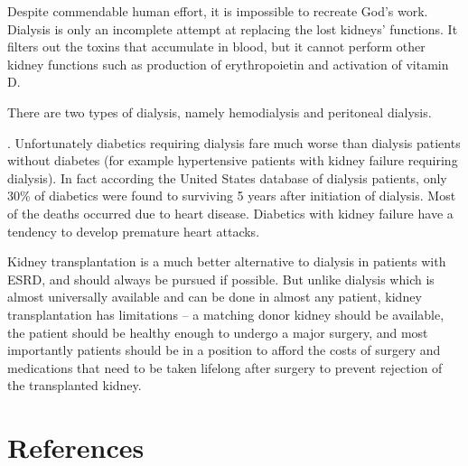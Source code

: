 Despite commendable human effort, it is impossible to recreate God’s work. Dialysis is only an incomplete attempt at replacing the lost kidneys’ functions. It filters out the toxins that accumulate in blood, but it cannot perform other kidney functions such as production of erythropoietin and activation of vitamin D.

There are two types of dialysis, namely hemodialysis and peritoneal dialysis.

. Unfortunately diabetics requiring dialysis fare much worse than dialysis patients without diabetes (for example hypertensive patients with kidney failure requiring dialysis). In fact according the United States database of dialysis patients, only 30\% of diabetics were found to surviving 5 years after initiation of dialysis. Most of the deaths occurred due to heart disease. Diabetics with kidney failure have a tendency to develop premature heart attacks.


Kidney transplantation is a much better alternative to dialysis in patients with ESRD, and should always be pursued if possible. But unlike dialysis which is almost universally available and can be done in almost any patient, kidney transplantation has limitations – a matching donor kidney should be available, the patient should be healthy enough to undergo a major surgery, and most importantly patients should be in a position to afford the costs of surgery and medications that need to be taken lifelong after surgery to prevent rejection of the transplanted kidney.


\section*{References}

